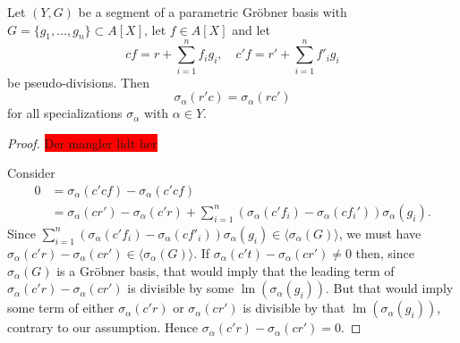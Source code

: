 \documentclass[a4paper, 12pt]{article}
\DeclareMathOperator{\LM}{lm}
\theoremstyle{changedot}
\theoremstyle{changedotbreak}
\theoremstyle{nonumberplain}
\newtheorem{proof}{Proof}
\begin{document}
\begin{lemma}\label{lem:ps_rem_unique}
  Let $(Y, G)$ be a segment of a parametric Gröbner basis with $G = \{g_{1}, \dots, g_{n}\} \subset A[X]$, let $f \in A[X]$ and let
  \[cf = r + \sum_{i=1}^{n} f_{i} g_{i}, \quad c'f = r' + \sum_{i=1}^{n} f'_{i} g_{i}\]
  be pseudo-divisions. Then
  \[\sigma_{\alpha}(r'c) = \sigma_{\alpha}(rc')\]
  for all specializations $\sigma_{\alpha}$ with $\alpha \in Y$.
\end{lemma}
\begin{proof}\colorbox{red}{Der mangler lidt her}

  Consider
  \begin{align*}
    0 &= \sigma_{\alpha}(c' c f) - \sigma_{\alpha}(c' c f) \\
      &= \sigma_{\alpha}(cr') - \sigma_{\alpha}(c'r) + \sum_{i=1}^{n}\left(\sigma_{\alpha}(c' f_{i}) - \sigma_{\alpha}(c f_{i}')\right)\sigma_{\alpha}(g_{i}).
  \end{align*}
  Since $\sum_{i=1}^{n}(\sigma_{\alpha}(c' f_{i}) - \sigma_{\alpha}(c f'_{i}))\sigma_{\alpha}(g_{i}) \in \langle \sigma_{\alpha}(G) \rangle$, we must have $\sigma_{\alpha}(c' r) - \sigma_{\alpha}(c r') \in \langle \sigma_{\alpha}(G) \rangle$. If $\sigma_{\alpha}(c't) - \sigma_{\alpha}(cr') \neq 0$ then, since $\sigma_{\alpha}(G)$ is a Gröbner basis, that would imply that the leading term of $\sigma_{\alpha}(c' r) - \sigma_{\alpha}(c r')$ is divisible by some $\LM(\sigma_{\alpha}(g_{i}))$. But that would imply some term of either $\sigma_{\alpha}(c' r)$ or $\sigma_{\alpha}(c r')$ is divisible by that $\LM(\sigma_{\alpha}(g_{i}))$, contrary to our assumption. Hence $\sigma_{\alpha}(c' r) - \sigma_{\alpha}(c r') = 0$.
\end{proof}
\end{document}
